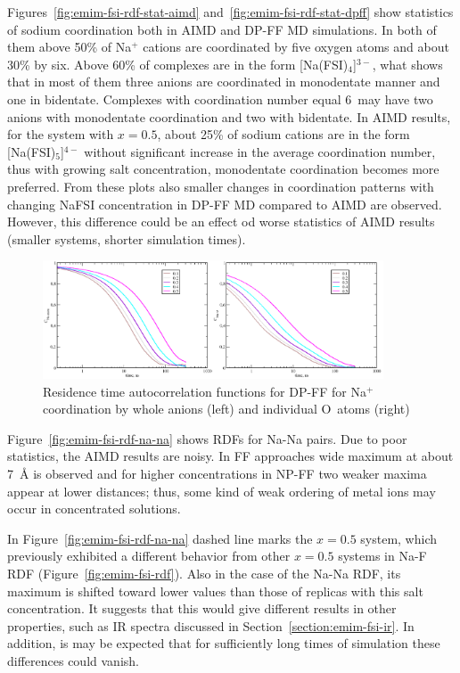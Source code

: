 Figures~\ref{fig:emim-fsi-rdf-stat-aimd} and~\ref{fig:emim-fsi-rdf-stat-dpff} show statistics of sodium coordination both in AIMD and DP-FF MD simulations. In both of them above 50\% of Na$^{+}$ cations are coordinated by five oxygen atoms and about 30\% by six. Above 60\% of complexes are in the form [Na(FSI)$_4$]$^{3-}$, what shows that in most of them three anions are coordinated in monodentate manner and one in bidentate. Complexes with coordination number equal 6~may have two anions with monodentate coordination and two with bidentate. In AIMD results, for the system with $x = 0.5$, about 25\% of sodium cations are in the form [Na(FSI)$_5$]$^{4-}$ without significant increase in the average coordination number, thus with growing salt concentration, monodentate coordination becomes more preferred. From these plots also smaller changes in coordination patterns with changing NaFSI concentration in DP-FF MD compared to AIMD are observed. However, this difference could be an effect od worse statistics of AIMD results (smaller systems, shorter simulation times).

\begin{figure}[ht]
    \centering
    \includegraphics[width=0.9\textwidth]{img/3-structural-data-from-md-simulations/1-emim-fsi/autocorrelation/residence.png}
    \caption{Residence time autocorrelation functions for DP-FF for Na$^{+}$ coordination by whole anions (left) and individual O~atoms (right)}
    \label{fig:emim-fsi-residence}
\end{figure}

Figure~\ref{fig:emim-fsi-rdf-na-na} shows RDFs for Na-Na pairs. Due to poor statistics, the AIMD results are noisy. In FF approaches wide maximum at about 7~{\AA} is observed and for higher concentrations in NP-FF two weaker maxima appear at lower distances; thus, some kind of weak ordering of metal ions may occur in concentrated solutions.

In Figure~\ref{fig:emim-fsi-rdf-na-na} dashed line marks the $x = 0.5$ system, which previously exhibited a different behavior from other $x = 0.5$ systems in Na-F RDF (Figure~\ref{fig:emim-fsi-rdf}). Also in the case of the Na-Na RDF, its maximum is shifted toward lower values than those of replicas with this salt concentration. It suggests that this would give different results in other properties, such as IR spectra discussed in Section~\ref{section:emim-fsi-ir}. In addition, is may be expected that for sufficiently long times of simulation these differences could vanish.

